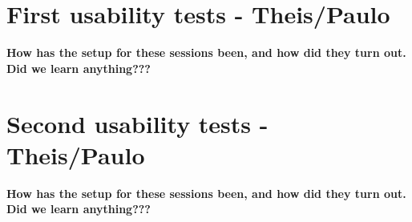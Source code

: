 \section{First usability tests - Theis/Paulo}
\textbf{How has the setup for these sessions been, and how did they turn out. Did we learn anything???}



\section{Second usability tests - Theis/Paulo}
\textbf{How has the setup for these sessions been, and how did they turn out. Did we learn anything???}

